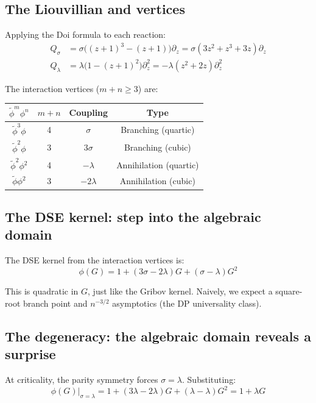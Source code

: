 \documentclass[11pt,a4paper]{article}
\theoremstyle{definition}
\newcommand{\phit}{\tilde{\phi}}
\begin{document}
\subsection{The Liouvillian and vertices}

Applying the Doi formula to each reaction:
\begin{align}
Q_\sigma &= \sigma\bigl((z{+}1)^3 - (z{+}1)\bigr)\partial_z
= \sigma(3z^2 + z^3 + 3z)\partial_z \\
Q_\lambda &= \lambda\bigl(1 - (z{+}1)^2\bigr)\partial_z^2
= -\lambda(z^2 + 2z)\partial_z^2
\end{align}

The interaction vertices ($m+n \geq 3$) are:

\begin{center}
\renewcommand{\arraystretch}{1.2}
\begin{tabular}{cccc}
\toprule
$\phit^m\phi^n$ & $m+n$ & Coupling & Type \\
\midrule
$\phit^3\phi$ & 4 & $\sigma$ & Branching (quartic) \\
$\phit^2\phi$ & 3 & $3\sigma$ & Branching (cubic) \\
$\phit^2\phi^2$ & 4 & $-\lambda$ & Annihilation (quartic) \\
$\phit\phi^2$ & 3 & $-2\lambda$ & Annihilation (cubic) \\
\bottomrule
\end{tabular}
\end{center}

\subsection{The DSE kernel: step into the algebraic domain}

The DSE kernel from the interaction vertices is:
\begin{equation}
\phi(G) = 1 + (3\sigma - 2\lambda)G + (\sigma - \lambda)G^2
\label{eq:barw_phi}
\end{equation}

This is quadratic in $G$, just like the Gribov kernel. Naively, we
expect a square-root branch point and $n^{-3/2}$ asymptotics (the DP
universality class).

\subsection{The degeneracy: the algebraic domain reveals a surprise}

At criticality, the parity symmetry forces $\sigma = \lambda$. Substituting:
\begin{equation}
\phi(G)\big|_{\sigma=\lambda} = 1 + (3\lambda - 2\lambda)G + (\lambda - \lambda)G^2
= 1 + \lambda G
\end{equation}
\end{document}
